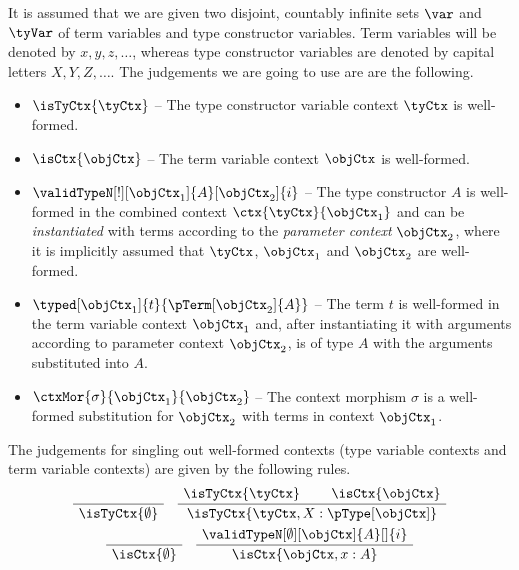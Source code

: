 \documentclass[preprint]{sigplanconf}
\begin{document}
It is assumed that we are given two disjoint, countably infinite sets $\var$ and
$\tyVar$ of term variables and type constructor variables.
Term variables will be denoted by $x, y, z, \dotsc$, whereas type constructor
variables are denoted by capital letters $X, Y, Z, \dotsc$.
The judgements we are going to use are are the following.
\begin{itemize}
\item $\isTyCtx{\tyCtx}$ -- The type constructor variable context $\tyCtx$ is
  well-formed.
\item $\isCtx{\objCtx}$ -- The term variable context $\objCtx$ is well-formed.
\item $\validTypeN[!][\objCtx_1]{A}[\objCtx_2]{i}$
  -- The type constructor $A$ is well-formed in the combined context $\ctx{\tyCtx}{\objCtx_1}$
  and can be \emph{instantiated} with terms according to the
  \emph{parameter context} $\objCtx_2$, where it
  is implicitly assumed that $\tyCtx$, $\objCtx_1$ and $\objCtx_2$ are
  well-formed.
\item $\typed[\objCtx_1]{t}{\pTerm[\objCtx_2]{A}}$ -- The term $t$ is
  well-formed  in the term variable context $\objCtx_1$ and, after instantiating
  it with arguments according to parameter context $\objCtx_2$, is of type $A$
  with the arguments substituted into $A$.
\item $\ctxMor{\sigma}{\objCtx_1}{\objCtx_2}$ -- The context morphism $\sigma$
  is a well-formed substitution for $\objCtx_2$ with terms in context
  $\objCtx_1$.
\end{itemize}

\begin{definition}
  \label{def:wffctx}
  The judgements for singling out well-formed contexts (type variable contexts
  and term variable contexts) are given by the following rules.
  \begin{gather*}
    \AxiomC{}
    \UnaryInfC{$\isTyCtx{\emptyset}$}
    \bottomAlignProof
    \DisplayProof
    \quad
    \AxiomC{$\isTyCtx{\tyCtx}$}
    \AxiomC{$\isCtx{\objCtx}$}
    \BinaryInfC{$
      \isTyCtx{\tyCtx, X : \pType[\objCtx]}$}
    \bottomAlignProof
    \DisplayProof
    \\
    \AxiomC{}
    \UnaryInfC{$\isCtx{\emptyset}$}
    \bottomAlignProof
    \DisplayProof
    \quad
    \AxiomC{$\validTypeN[\emptyset][\objCtx]{A}[]{i}$}
    \UnaryInfC{$\isCtx{\objCtx, x:A}$}
    \bottomAlignProof
    \DisplayProof
  \end{gather*}
\end{definition}
\end{document}
